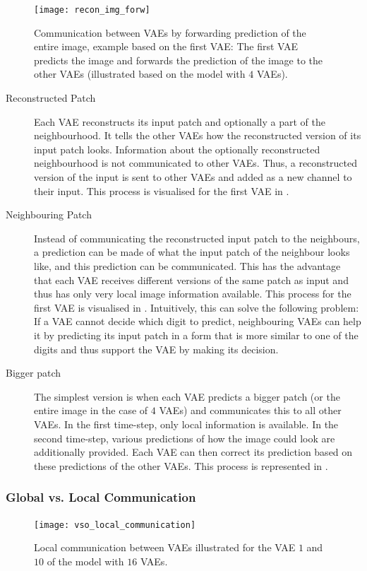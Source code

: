 \begin{figure}
    \centering
    \texttt{[image: recon\_img\_forw]}
    \caption[Communication between VAEs by forwarding prediction of the entire image]{Communication between VAEs by forwarding prediction of the entire image, example based on the first VAE: The first VAE predicts the image and forwards the prediction of the image to the other VAEs (illustrated based on the model with $4$ VAEs).}
\end{figure}



\begin{description}
	\item [Reconstructed Patch] Each VAE reconstructs its input patch and optionally a part of the neighbourhood. It tells the other VAEs how the reconstructed version of its input patch looks. Information about the optionally reconstructed neighbourhood is not communicated to other VAEs. Thus, a reconstructed version of the input is sent to other VAEs and added as a new channel to their input. This process is visualised for the first VAE in . 
	\item [Neighbouring Patch] Instead of communicating the reconstructed input patch to the neighbours, a prediction can be made of what the input patch of the neighbour looks like, and this prediction can be communicated. This has the advantage that each VAE receives different versions of the same patch as input and thus has only very local image information available. This process for the first VAE is visualised in . Intuitively, this can solve the following problem: If a VAE cannot decide which digit to predict, neighbouring VAEs can help it by predicting its input patch in a form that is more similar to one of the digits and thus support the VAE by making its decision. 
	\item[Bigger patch] The simplest version is when each VAE predicts a bigger patch (or the entire image in the case of $4$ VAEs) and communicates this to all other VAEs. In the first time-step, only local information is available. In the second time-step, various predictions of how the image could look are additionally provided. Each VAE can then correct its prediction based on these predictions of the other VAEs. This process is represented in . 
\end{description}

\subsubsection{Global vs. Local Communication}
\begin{figure}
    \centering
    \texttt{[image: vso\_local\_communication]}
    \caption[Local communication between VAEs]{Local communication between VAEs illustrated for the VAE $1$ and $10$ of the model with $16$ VAEs.}
\end{figure}


